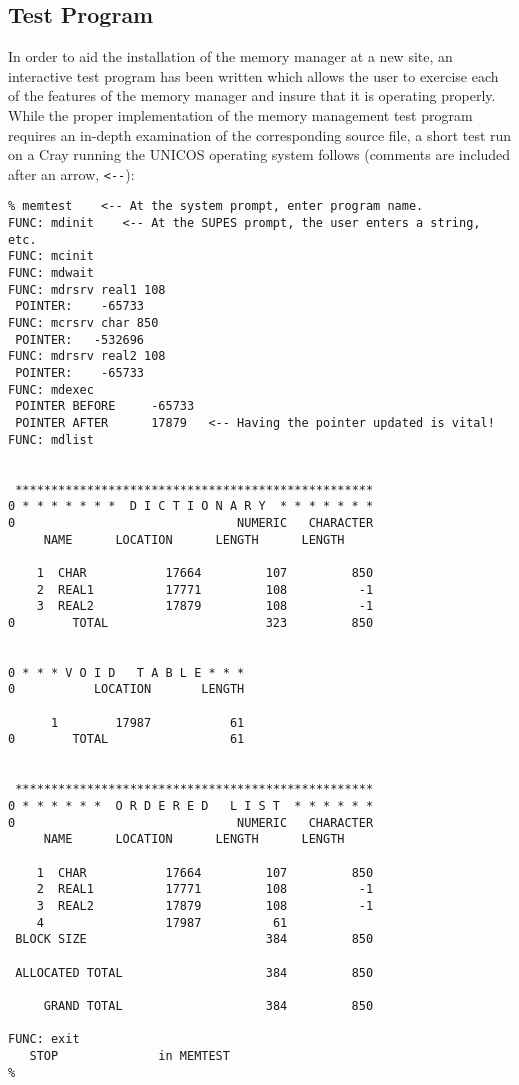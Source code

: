 \subsection{Test Program}
In order to aid the installation of the memory manager at a new site, an
interactive test program has been written which allows the user to exercise
each of the features of the memory manager and insure that it is operating
properly.
While the proper implementation of the memory management test program
requires an in-depth examination of the corresponding source file,
a short test run on a Cray running the UNICOS operating system follows
(comments are included after an arrow, \verb+<--+):
\begin{verbatim}
% memtest    <-- At the system prompt, enter program name.
FUNC: mdinit    <-- At the SUPES prompt, the user enters a string, etc.
FUNC: mcinit
FUNC: mdwait
FUNC: mdrsrv real1 108
 POINTER:    -65733
FUNC: mcrsrv char 850
 POINTER:   -532696
FUNC: mdrsrv real2 108
 POINTER:    -65733
FUNC: mdexec
 POINTER BEFORE     -65733
 POINTER AFTER      17879   <-- Having the pointer updated is vital!
FUNC: mdlist


 **************************************************
0 * * * * * * *  D I C T I O N A R Y  * * * * * * *
0                               NUMERIC   CHARACTER
	 NAME      LOCATION      LENGTH      LENGTH

    1  CHAR           17664         107         850
    2  REAL1          17771         108          -1
    3  REAL2          17879         108          -1
0        TOTAL                      323         850


0 * * * V O I D   T A B L E * * *
0           LOCATION       LENGTH

      1        17987           61
0        TOTAL                 61


 **************************************************
0 * * * * * *  O R D E R E D   L I S T  * * * * * *
0                               NUMERIC   CHARACTER
	 NAME      LOCATION      LENGTH      LENGTH

    1  CHAR           17664         107         850
    2  REAL1          17771         108          -1
    3  REAL2          17879         108          -1
    4                 17987          61
 BLOCK SIZE                         384         850

 ALLOCATED TOTAL                    384         850

     GRAND TOTAL                    384         850

FUNC: exit
   STOP              in MEMTEST
%
\end{verbatim}


